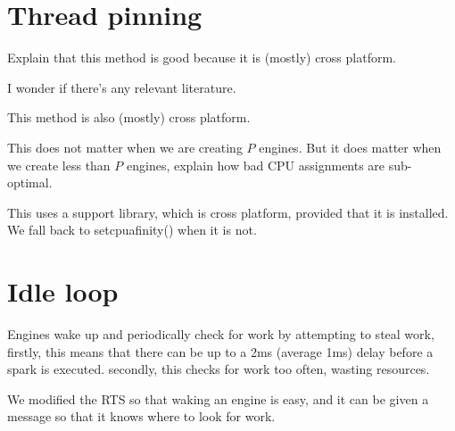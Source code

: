 
\section{Thread pinning}
\label{sec:thread_pinning}


Explain that this method is good because it is (mostly) cross platform.

I wonder if there's any relevant literature.

This method is also (mostly) cross platform.

This does not matter when we are creating $P$ engines.
But it does matter when we create less than $P$ engines,
explain how bad CPU assignments are sub-optimal.

This uses a support library, which is cross platform, provided that it is installed.
We fall back to setcpuafinity() when it is not.


\section{Idle loop}
\label{sec:idle_loop}

Engines wake up and periodically check for work by attempting to
steal work,
firstly, this means that there can be up to a 2ms (average 1ms) delay before
a spark is executed.
secondly, this checks for work too often, wasting resources.

We modified the RTS so that waking an engine is easy, and it can be given a
message so that it knows where to look for work.



